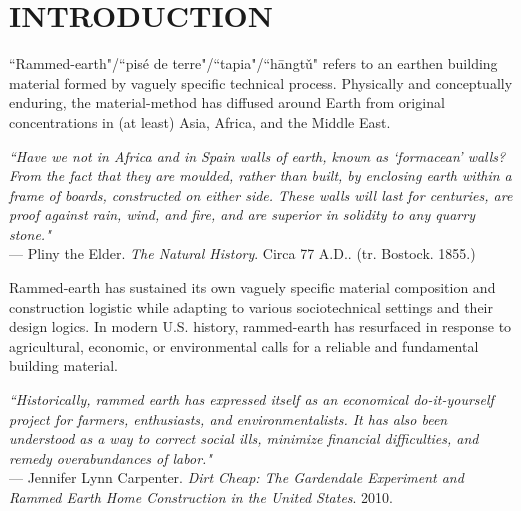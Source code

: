 \section{INTRODUCTION}


``Rammed-earth"/``pis\'e de terre"/``tapia"/``h\=angt\v u" refers to an earthen building material formed by vaguely specific technical process. Physically and conceptually enduring, the material-method has diffused around Earth from original concentrations in (at least) Asia, Africa, and the Middle East. \cite{RAMMEDEARTHHOUSE}

\begin{flushright}
\small{
\textit{``Have we not in Africa and in Spain walls of earth, known as `formacean' walls? From the fact that they are moulded, rather than built, by enclosing earth within a frame of boards, constructed on either side. These walls will last for centuries, are proof against rain, wind, and fire, and are superior in solidity to any quarry stone."}}\\ --- Pliny the Elder. \textit{The Natural History}. Circa 77 A.D.. (tr. Bostock. 1855.)
\end{flushright}

Rammed-earth has sustained its own vaguely specific material composition and construction logistic while adapting to various sociotechnical settings and their design logics. In modern U.S. history, rammed-earth has resurfaced in response to agricultural, economic, or environmental calls for a reliable and fundamental building material.

\begin{flushright}
\small{
\textit{
``Historically, rammed earth has expressed itself as an economical do-it-yourself project for farmers, enthusiasts, and environmentalists. It has also been understood as a way to correct social ills, minimize financial difficulties, and remedy overabundances of labor."}}\\ --- Jennifer Lynn Carpenter. \textit{Dirt Cheap: The Gardendale Experiment and Rammed Earth Home Construction in the United States}. 2010.
\end{flushright}

